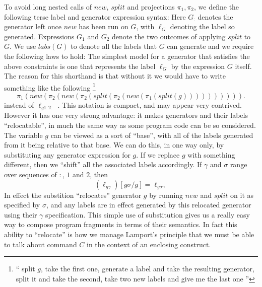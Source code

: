 To avoid long nested calls of $new$, $split$ and projections $\pi_1,\pi_2$,
we define the following terse label and generator expression syntax:
Here $G_{:}$ denotes the generator left once $new$ has been run on $G$,
with $\ell_G$ denoting the label so generated.
Expressions $G_1$ and $G_2$ denote the two outcomes of applying $split$ to $G$.
We use $labs(G)$ to denote all the labels that $G$ can generate
and we require the following laws to hold:
The simplest model for a generator that satisfies the above constraints
is one that represents the label $\ell_G$ by the expression $G$ itself.
The reason for this shorthand is that without it we would have to write
something like the following%
\footnote{``
split $g$, take the first one,
generate a label and take the resulting
generator, split it and take the second,
take two new labels and give me the last one
''}
\begin{equation*}
\pi_1(new(\pi_2(new(\pi_2(split(\pi_2(new(\pi_1(split(g)))))))))).
\end{equation*}
instead of $\ell_{g1:2:}$
.
This notation is compact, and may appear very contrived.
However it has one very strong advantage:
it makes generators and their labels ``relocatable'',
in much the same way as some program code can be so considered.
The variable $g$ can be viewed as a sort of ``base'',
with all of the labels generated from it being relative to that base.
We can do this, in one way only, by substituting any generator expression
for $g$. If we replace $g$ with something different,
then we ``shift'' all the associated labels accordingly.
If $\gamma$ and $\sigma$ range over sequences of $:$, $1$ and $2$, then
\begin{equation}
   (\ell_{g\gamma})[g\sigma/g]  = \ell_{g\sigma\gamma}
\end{equation}
In effect the substition ``relocates'' generator $g$ by running $new$
and $split$ on it as specified by $\sigma$,
and any labels are in effect generated by this relocated generator using
their $\gamma$ specification.
This simple use of substitution gives us a really easy way to compose
program fragments in terms of their semantics.
In fact this ability to ``relocate'' is how
we manage Lamport's principle that we must be able to talk about command $C$ in the context of an enclosing construct.
